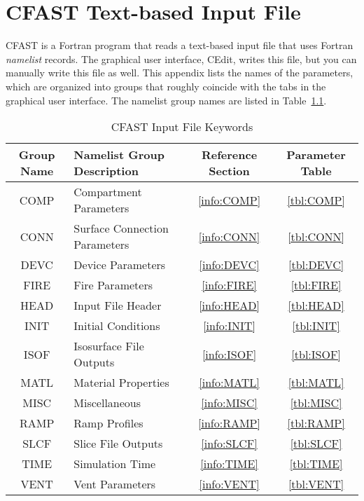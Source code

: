 \chapter{CFAST Text-based Input File}

CFAST is a Fortran program that reads a text-based input file that uses Fortran {\em namelist} records. The graphical user interface, CEdit, writes this file, but you can manually write this file as well. This appendix lists the names of the parameters, which are organized into groups that roughly coincide with the tabs in the graphical user interface. The namelist group names are listed in Table~\ref{tbl:namelistgroups}.

\begin{table}[ht]
\begin{center}
\caption{CFAST Input File Keywords}
\label{tbl:namelistgroups}
\begin{tabular}{|c|l|c|c|}
\hline
Group Name  & Namelist Group Description& Reference Section & Parameter Table  \\ \hline
{\ct COMP}   & Compartment Parameters         & \ref{info:COMP} & \ref{tbl:COMP}  \\ \hline
{\ct CONN}   & Surface Connection Parameters          & \ref{info:CONN} & \ref{tbl:CONN}  \\ \hline
{\ct DEVC}    & Device Parameters          & \ref{info:DEVC} & \ref{tbl:DEVC}  \\ \hline
{\ct FIRE}     & Fire Parameters  & \ref{info:FIRE} & \ref{tbl:FIRE}  \\ \hline
{\ct HEAD}    & Input File Header            & \ref{info:HEAD} & \ref{tbl:HEAD}  \\ \hline
{\ct INIT}      & Initial Conditions            & \ref{info:INIT} & \ref{tbl:INIT}  \\ \hline
{\ct ISOF}     & Isosurface File Outputs            & \ref{info:ISOF} & \ref{tbl:ISOF}  \\ \hline
{\ct MATL}    & Material Properties           & \ref{info:MATL} & \ref{tbl:MATL}  \\ \hline
{\ct MISC}     & Miscellaneous    & \ref{info:MISC} & \ref{tbl:MISC}  \\ \hline
{\ct RAMP}    & Ramp Profiles            & \ref{info:RAMP} & \ref{tbl:RAMP}  \\ \hline
{\ct SLCF}     & Slice File Outputs       & \ref{info:SLCF} & \ref{tbl:SLCF}  \\ \hline
{\ct TIME}     & Simulation Time            & \ref{info:TIME} & \ref{tbl:TIME}  \\ \hline
{\ct VENT}     & Vent Parameters              & \ref{info:VENT} & \ref{tbl:VENT}  \\ \hline
\end{tabular}
\end{center}
\end{table}

